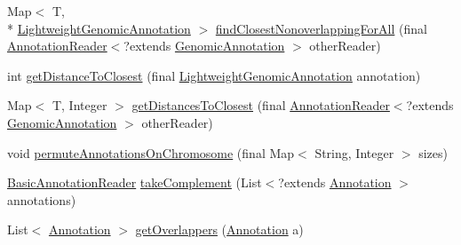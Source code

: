 \begin{DoxyCompactItemize}
\item 
Map$<$ T, \\*
\hyperlink{interfacebroad_1_1core_1_1annotation_1_1_lightweight_genomic_annotation}{Lightweight\+Genomic\+Annotation} $>$ \hyperlink{classbroad_1_1core_1_1annotation_1_1_annotation_reader_3_01_t_01extends_01_genomic_annotation_01_4_a006879bffd7a49fb217cf1800a71ee5d}{find\+Closest\+Nonoverlapping\+For\+All} (final \hyperlink{classbroad_1_1core_1_1annotation_1_1_annotation_reader_3_01_t_01extends_01_genomic_annotation_01_4_adc7b77cf9681958941014c7b460dbb9f}{Annotation\+Reader}$<$?extends \hyperlink{interfacebroad_1_1core_1_1annotation_1_1_genomic_annotation}{Genomic\+Annotation} $>$ other\+Reader)
\item 
int \hyperlink{classbroad_1_1core_1_1annotation_1_1_annotation_reader_3_01_t_01extends_01_genomic_annotation_01_4_aa3a5e5fc97cb560c6a4ff633f204147c}{get\+Distance\+To\+Closest} (final \hyperlink{interfacebroad_1_1core_1_1annotation_1_1_lightweight_genomic_annotation}{Lightweight\+Genomic\+Annotation} annotation)
\item 
Map$<$ T, Integer $>$ \hyperlink{classbroad_1_1core_1_1annotation_1_1_annotation_reader_3_01_t_01extends_01_genomic_annotation_01_4_a0c53608fb99256004374dd6b0bdd3185}{get\+Distances\+To\+Closest} (final \hyperlink{classbroad_1_1core_1_1annotation_1_1_annotation_reader_3_01_t_01extends_01_genomic_annotation_01_4_adc7b77cf9681958941014c7b460dbb9f}{Annotation\+Reader}$<$?extends \hyperlink{interfacebroad_1_1core_1_1annotation_1_1_genomic_annotation}{Genomic\+Annotation} $>$ other\+Reader)
\item 
void \hyperlink{classbroad_1_1core_1_1annotation_1_1_annotation_reader_3_01_t_01extends_01_genomic_annotation_01_4_aae79cc395d5eb19c82602737af680260}{permute\+Annotations\+On\+Chromosome} (final Map$<$ String, Integer $>$ sizes)
\item 
\hyperlink{classbroad_1_1core_1_1annotation_1_1_basic_annotation_reader}{Basic\+Annotation\+Reader} \hyperlink{classbroad_1_1core_1_1annotation_1_1_annotation_reader_3_01_t_01extends_01_genomic_annotation_01_4_a6806c878b0c400f5139bc7d18bdffd4b}{take\+Complement} (List$<$?extends \hyperlink{interfaceumms_1_1core_1_1annotation_1_1_annotation}{Annotation} $>$ annotations)
\item 
List$<$ \hyperlink{interfaceumms_1_1core_1_1annotation_1_1_annotation}{Annotation} $>$ \hyperlink{classbroad_1_1core_1_1annotation_1_1_annotation_reader_3_01_t_01extends_01_genomic_annotation_01_4_a9105fc31a2ce3c17aae9804da9254702}{get\+Overlappers} (\hyperlink{interfaceumms_1_1core_1_1annotation_1_1_annotation}{Annotation} a)

\end{DoxyCompactItemize}
